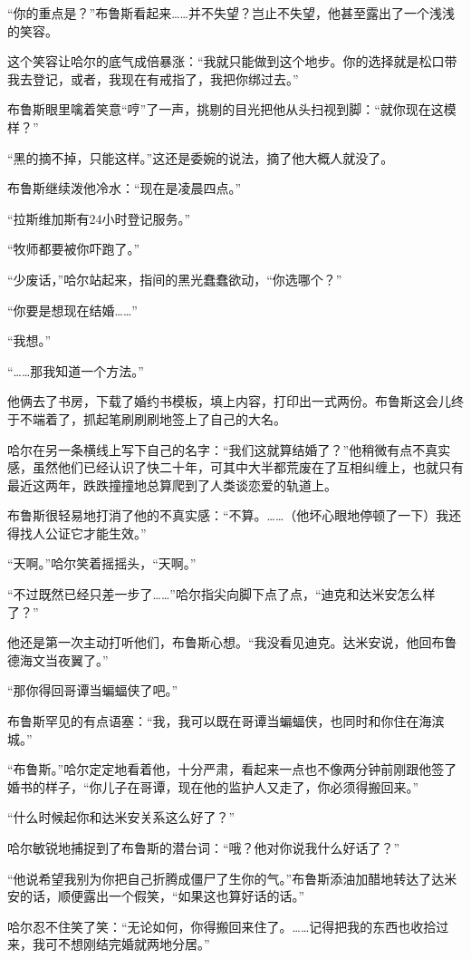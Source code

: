 \documentclass[../main]{subfiles}
\begin{document}
“你的重点是？”布鲁斯看起来……并不失望？岂止不失望，他甚至露出了一个浅浅的笑容。

这个笑容让哈尔的底气成倍暴涨：“我就只能做到这个地步。你的选择就是松口带我去登记，或者，我现在有戒指了，我把你绑过去。”

布鲁斯眼里噙着笑意“哼”了一声，挑剔的目光把他从头扫视到脚：“就你现在这模样？”

“黑的摘不掉，只能这样。”这还是委婉的说法，摘了他大概人就没了。

布鲁斯继续泼他冷水：“现在是凌晨四点。”

“拉斯维加斯有24小时登记服务。”

“牧师都要被你吓跑了。”

“少废话，”哈尔站起来，指间的黑光蠢蠢欲动，“你选哪个？”

“你要是想现在结婚……”

“我想。”

“……那我知道一个方法。”

他俩去了书房，下载了婚约书模板，填上内容，打印出一式两份。布鲁斯这会儿终于不端着了，抓起笔刷刷刷地签上了自己的大名。

哈尔在另一条横线上写下自己的名字：“我们这就算结婚了？”他稍微有点不真实感，虽然他们已经认识了快二十年，可其中大半都荒废在了互相纠缠上，也就只有最近这两年，跌跌撞撞地总算爬到了人类谈恋爱的轨道上。

布鲁斯很轻易地打消了他的不真实感：“不算。……（他坏心眼地停顿了一下）我还得找人公证它才能生效。”

“天啊。”哈尔笑着摇摇头，“天啊。”

“不过既然已经只差一步了……”哈尔指尖向脚下点了点，“迪克和达米安怎么样了？”

他还是第一次主动打听他们，布鲁斯心想。“我没看见迪克。达米安说，他回布鲁德海文当夜翼了。”

“那你得回哥谭当蝙蝠侠了吧。”

布鲁斯罕见的有点语塞：“我，我可以既在哥谭当蝙蝠侠，也同时和你住在海滨城。”

“布鲁斯。”哈尔定定地看着他，十分严肃，看起来一点也不像两分钟前刚跟他签了婚书的样子，“你儿子在哥谭，现在他的监护人又走了，你必须得搬回来。”

“什么时候起你和达米安关系这么好了？”

哈尔敏锐地捕捉到了布鲁斯的潜台词：“哦？他对你说我什么好话了？”

“他说希望我别为你把自己折腾成僵尸了生你的气。”布鲁斯添油加醋地转达了达米安的话，顺便露出一个假笑，“如果这也算好话的话。”

哈尔忍不住笑了笑：“无论如何，你得搬回来住了。……记得把我的东西也收拾过来，我可不想刚结完婚就两地分居。”
\end{document}
